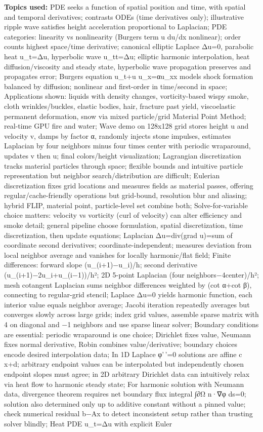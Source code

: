 \textbf{Topics used:} PDE seeks a function of spatial position and time, with spatial and temporal derivatives; contrasts ODEs (time derivatives only); illustrative ripple wave satisfies height acceleration proportional to Laplacian; PDE categories: linearity vs nonlinearity (Burgers term u du/dx nonlinear); order counts highest space/time derivative; canonical elliptic Laplace Δu=0, parabolic heat u\_t=Δu, hyperbolic wave u\_tt=Δu; elliptic harmonic interpolation, heat diffusion/viscosity and steady state, hyperbolic wave propagation preserves and propagates error; Burgers equation u\_t+u u\_x=αu\_xx models shock formation balanced by diffusion; nonlinear and first-order in time/second in space; Applications shown: liquids with density changes, vorticity-based wispy smoke, cloth wrinkles/buckles, elastic bodies, hair, fracture past yield, viscoelastic permanent deformation, snow via mixed particle/grid Material Point Method; real-time GPU fire and water; Wave demo on 128x128 grid stores height u and velocity v, damps by factor α, randomly injects stone impulses, estimates Laplacian by four neighbors minus four times center with periodic wraparound, updates v then u; final colors/height visualization; Lagrangian discretization tracks material particles through space; flexible bounds and intuitive particle representation but neighbor search/distribution are difficult; Eulerian discretization fixes grid locations and measures fields as material passes, offering regular/cache-friendly operations but grid-bound, resolution blur and aliasing; hybrid FLIP, material point, particle-level set combine both; Solve-for-variable choice matters: velocity vs vorticity (curl of velocity) can alter efficiency and smoke detail; general pipeline choose formulation, spatial discretization, time discretization, then update equations; Laplacian Δu=div(grad u)=sum of coordinate second derivatives; coordinate-independent; measures deviation from local neighbor average and vanishes for locally harmonic/flat field; Finite differences: forward slope (u\_(i+1)−u\_i)/h; second derivative (u\_(i+1)−2u\_i+u\_(i−1))/h²; 2D 5-point Laplacian (four neighbors−4center)/h²; mesh cotangent Laplacian sums neighbor differences weighted by (cot α+cot β), connecting to regular-grid stencil; Laplace Δu=0 yields harmonic function, each interior value equals neighbor average; Jacobi iteration repeatedly averages but converges slowly across large grids; index grid values, assemble sparse matrix with 4 on diagonal and −1 neighbors and use sparse linear solver; Boundary conditions are essential: periodic wraparound is one choice; Dirichlet fixes value, Neumann fixes normal derivative, Robin combines value/derivative; boundary choices encode desired interpolation data; In 1D Laplace φ'\,'=0 solutions are affine c x+d; arbitrary endpoint values can be interpolated but independently chosen endpoint slopes must agree; in 2D arbitrary Dirichlet data can intuitively relax via heat flow to harmonic steady state; For harmonic solution with Neumann data, divergence theorem requires net boundary flux integral ∫∂Ω n·∇φ ds=0; solution also determined only up to additive constant without a pinned value; check numerical residual b−Ax to detect inconsistent setup rather than trusting solver blindly; Heat PDE u\_t=Δu with explicit Euler 